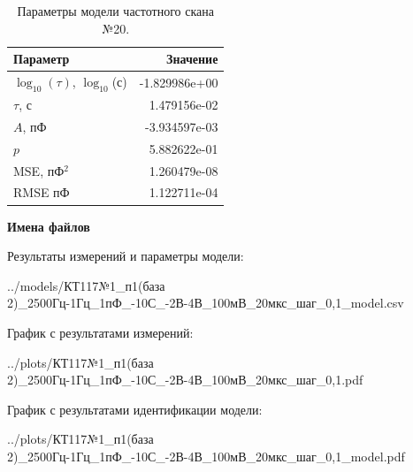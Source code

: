 \begin{table}[!ht]
    \centering
    \caption{Параметры модели частотного скана №20.}
    \begin{tabular}{|l|r|}
        \hline
        Параметр                                       & Значение                  \\ \hline
        $\log_{10}(\tau)$, $\log_{10}$(с)              & -1.829986e+00             \\ \hline
        $\tau$, с                                      & 1.479156e-02              \\ \hline
        $A$, пФ                                        & -3.934597e-03             \\ \hline
        $p$                                            & 5.882622e-01              \\ \hline
        MSE, пФ$^2$                                    & 1.260479e-08              \\ \hline
        RMSE пФ                                        & 1.122711e-04              \\ \hline
    \end{tabular}
    \label{table:frequency_scan_model_20}
\end{table}

\textbf{Имена файлов}

Результаты измерений и параметры модели:

\scriptsize../models/КТ117№1\_п1(база 2)\_2500Гц-1Гц\_1пФ\_-10С\_-2В-4В\_100мВ\_20мкс\_шаг\_0,1\_model.csv
\normalsize

График с результатами измерений:

\scriptsize../plots/КТ117№1\_п1(база 2)\_2500Гц-1Гц\_1пФ\_-10С\_-2В-4В\_100мВ\_20мкс\_шаг\_0,1.pdf
\normalsize

График с результатами идентификации модели:

\scriptsize../plots/КТ117№1\_п1(база 2)\_2500Гц-1Гц\_1пФ\_-10С\_-2В-4В\_100мВ\_20мкс\_шаг\_0,1\_model.pdf
\normalsize

